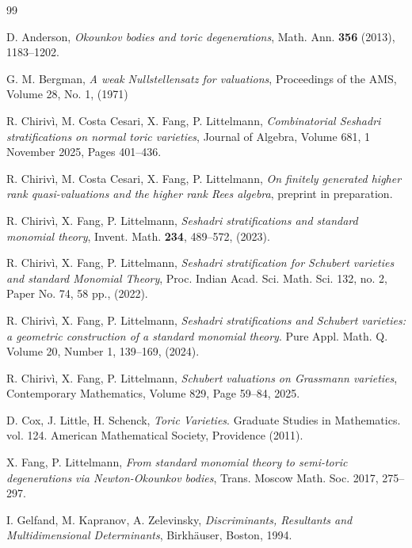 \documentclass[12pt, a4article]{amsart}   	%
\numberwithin{equation}{section}
\theoremstyle{plain}
\theoremstyle{definition}
\begin{document}
\begin{thebibliography}{99}

D. Anderson, \emph{Okounkov bodies and toric degenerations}, Math. Ann. {\bf 356} (2013), 1183--1202.

G. M. Bergman, \emph{A weak Nullstellensatz for valuations},  Proceedings of the AMS, 
Volume 28, No. 1, (1971)


R. Chiriv\`i, M. Costa Cesari, X. Fang, P. Littelmann, 
\emph{Combinatorial Seshadri stratifications on normal toric varieties},  Journal of Algebra, Volume 681, 1 November 2025, Pages 401--436.

R. Chiriv\`i, M. Costa Cesari, X. Fang, P. Littelmann, 
\emph{On finitely generated higher rank quasi-valuations
and the higher rank Rees algebra}, preprint in preparation.

R. Chiriv\`i, X. Fang, P. Littelmann, 
\emph{Seshadri stratifications and standard monomial theory}, 
Invent. Math. {\bf 234}, 489--572, (2023).

R. Chiriv\`i, X. Fang, P. Littelmann, 
\emph{Seshadri stratification for Schubert varieties and standard Monomial Theory}, 
Proc. Indian Acad. Sci. Math. Sci. 132, no. 2, Paper No. 74, 58 pp., (2022).

R. Chiriv\`i, X. Fang, P. Littelmann, 
\emph{Seshadri stratifications and Schubert varieties: a geometric construction of a standard monomial theory}. Pure Appl. Math. Q. Volume 20, Number 1, 139--169, (2024). 

R. Chiriv\`i, X. Fang, P. Littelmann, 
\emph{Schubert valuations on Grassmann varieties},
Contemporary Mathematics, Volume 829, Page 59--84, 2025.

D. Cox, J. Little, H. Schenck, 
\emph{Toric Varieties}. Graduate Studies in Mathematics. vol. 124. American Mathematical Society, Providence (2011).


X. Fang, P. Littelmann, \emph{From standard monomial theory to semi-toric degenerations via Newton-Okounkov bodies}, Trans. Moscow Math. Soc. 2017, 275--297.

I. Gelfand, M. Kapranov, A. Zelevinsky, \emph{Discriminants, Resultants and Multidimensional
Determinants}, Birkh\"auser, Boston, 1994. 


\end{thebibliography}
\end{document}
